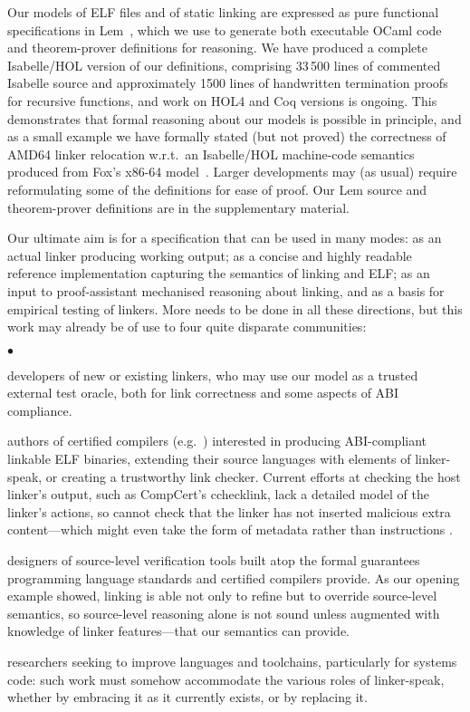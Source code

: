 \documentclass[preprint,10pt]{sigplanconf-pldi16}
\newenvironment{verytightitemize}{
\begin{list}{\hspace*{-2mm}$\bullet$}{
  \setlength{\itemsep}{1pt}
  \setlength{\topsep}{2pt}
  \setlength{\parskip}{0pt}
  \setlength{\leftmargin}{2mm}
  \setlength{\labelwidth}{0pt}
  \settowidth{\itemindent}{$\bullet$}
  \addtolength{\itemindent}{0mm}
  \setlength{\parsep}{0pt}}}{\end{list}
}
\begin{document}
Our models of ELF files and of static linking 
are expressed as pure functional specifications in
Lem~\cite{mulligan-lem-2014}, which we use to generate both executable
OCaml code and theorem-prover definitions for reasoning.  We have
produced a complete Isabelle/HOL version of our definitions, comprising 33\,500 lines of
commented Isabelle source and approximately 1500 lines of handwritten
termination proofs for recursive functions, and work on HOL4 and Coq
versions is ongoing.  
This demonstrates that formal reasoning about our models is possible
in principle, and as a small example we have formally stated (but not
proved) the
correctness of AMD64 linker relocation w.r.t.~an Isabelle/HOL
machine-code semantics produced from Fox's x86-64 model~\cite{DBLP:conf/itp/Fox15}.
Larger developments may (as usual) require
reformulating some of the definitions for ease of proof.  
Our Lem source %
and theorem-prover definitions are in the supplementary material. 


Our ultimate aim is for a specification that can be used in many
modes: as an actual linker producing working output; as a concise
and highly readable reference implementation capturing the semantics of linking and ELF; as an input to proof-assistant
mechanised reasoning about linking, and as a basis for empirical
testing of linkers.  More needs to be done in all these directions, 
but this work may already be of use to four quite disparate communities:
\begin{verytightitemize}
\item developers of new or existing linkers, who may use our model as a trusted external test oracle, both for link correctness and some aspects of ABI compliance.
\item authors of certified compilers (e.g.~\cite{amadio-certified-2014, kumar-cake-2014, leroy-formal-2009, sevcik-compcert-2013}) interested in producing ABI-compliant linkable ELF binaries, extending their source languages with elements of linker-speak, or creating a trustworthy link checker. Current efforts at checking the host linker's output, such as CompCert's \textsf{cchecklink}, lack a detailed model of the linker's actions,
so cannot check that the linker has not inserted malicious extra content---which
might even take the form of metadata rather than instructions \citep{shapiro_weird_2013}.

\item designers of source-level verification tools built atop the formal
guarantees programming language standards and certified compilers
provide. %
As our opening example showed, linking is able not only to refine but to override source-level semantics, so source-level reasoning alone is not sound unless augmented with knowledge of linker features---that our semantics can provide.

\item researchers seeking to improve languages and toolchains, particularly for systems code: such work must somehow accommodate the various roles of linker-speak, whether by embracing it as it currently exists, or by replacing it.
\end{verytightitemize}
\end{document}
